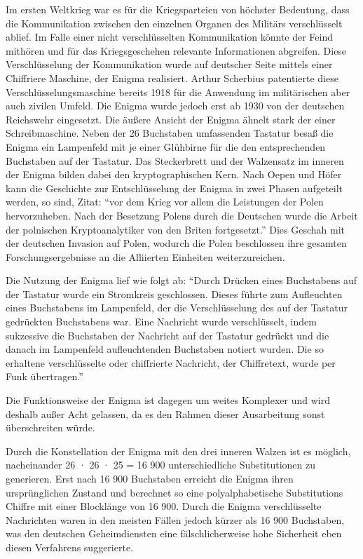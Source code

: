 Im ersten Weltkrieg war es für die Kriegsparteien von höchster Bedeutung, dass die Kommunikation zwischen den einzelnen Organen des Militärs verschlüsselt ablief. Im Falle einer nicht verschlüsselten Kommunikation könnte der Feind mithören und für das Kriegsgeschehen relevante Informationen abgreifen.
Diese Verschlüsselung der Kommunikation wurde auf deutscher Seite mittels einer Chiffriere Maschine, der Enigma realisiert. Arthur Scherbius patentierte diese Verschlüsselungsmaschine bereits 1918 für die Anwendung im militärischen aber auch zivilen Umfeld. \cite{bloemer_2012} Die Enigma wurde jedoch erst ab 1930 von der deutschen Reichswehr eingesetzt. \cite{bloemer_2012}
Die äußere Ansicht der Enigma ähnelt stark der einer Schreibmaschine. Neben der 26 Buchstaben umfassenden Tastatur besaß die Enigma ein Lampenfeld mit je einer Glühbirne für die den entsprechenden Buchstaben auf der Tastatur. \cite{bloemer_2012} Das Steckerbrett und der Walzensatz im inneren der Enigma bilden dabei den kryptographischen Kern. \cite{bloemer_2012}
Nach Oepen und Höfer kann die Geschichte zur Entschlüsselung der Enigma in zwei Phasen aufgeteilt werden, so sind, Zitat: \enquote{vor dem Krieg vor allem die Leistungen der Polen hervorzuheben. Nach der Besetzung Polens durch die Deutschen wurde die Arbeit der polnischen Kryptoanalytiker von den Briten fortgesetzt.}
Dies Geschah mit der deutschen Invasion auf Polen, wodurch die Polen beschlossen ihre gesamten Forschungsergebnisse an die Alliierten Einheiten weiterzureichen. \cite{oepen_hoefer_2007}

Die Nutzung der Enigma lief wie folgt ab:
\enquote{Durch Drücken eines Buchstabens auf der Tastatur wurde ein Stromkreis geschlossen. Dieses führte zum Aufleuchten eines Buchstabens im Lampenfeld, der die Verschlüsselung des auf der Tastatur gedrückten Buchstabens war. Eine Nachricht wurde verschlüsselt, indem sukzessive die Buchstaben der Nachricht auf der Tastatur gedrückt und die danach im Lampenfeld aufleuchtenden Buchstaben notiert wurden. Die so erhaltene verschlüsselte oder chiffrierte Nachricht, der Chiffretext, wurde per Funk übertragen.} \cite{bloemer_2012}

Die Funktionsweise der Enigma ist dagegen um weites Komplexer und wird deshalb außer Acht gelassen, da es den Rahmen dieser Ausarbeitung sonst überschreiten würde.

Durch die Konstellation der Enigma mit den drei inneren Walzen ist es möglich, nacheinander 26 · 26 · 25 = 16 900 unterschiedliche Substitutionen zu generieren. \cite{bloemer_2012} Erst nach 16 900 Buchstaben erreicht die Enigma ihren ursprünglichen Zustand und berechnet so eine  polyalphabetische Substitutions Chiffre mit einer Blocklänge von 16 900. \cite{bloemer_2012} Durch die Enigma verschlüsselte Nachrichten waren in den meisten Fällen jedoch kürzer als 16 900 Buchstaben, was den deutschen Geheimdiensten eine fälschlicherweise hohe Sicherheit eben diesen Verfahrens suggerierte. \cite{bloemer_2012}

